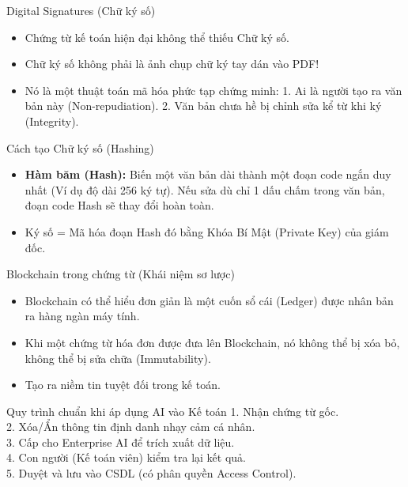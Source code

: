 \documentclass[aspectratio=169]{beamer}
\begin{document}
\begin{frame}{Digital Signatures (Chữ ký số)}
    \begin{itemize}
        \item Chứng từ kế toán hiện đại không thể thiếu Chữ ký số.
        \item Chữ ký số không phải là ảnh chụp chữ ký tay dán vào PDF!
        \item Nó là một thuật toán mã hóa phức tạp chứng minh:
        1. Ai là người tạo ra văn bản này (Non-repudiation).
        2. Văn bản chưa hề bị chỉnh sửa kể từ khi ký (Integrity).
    \end{itemize}
\end{frame}


\begin{frame}{Cách tạo Chữ ký số (Hashing)}
    \begin{itemize}
        \item \textbf{Hàm băm (Hash):} Biến một văn bản dài thành một đoạn code ngắn duy nhất (Ví dụ độ dài 256 ký tự). Nếu sửa dù chỉ 1 dấu chấm trong văn bản, đoạn code Hash sẽ thay đổi hoàn toàn.
        \item Ký số = Mã hóa đoạn Hash đó bằng Khóa Bí Mật (Private Key) của giám đốc.
    \end{itemize}
\end{frame}


\begin{frame}{Blockchain trong chứng từ (Khái niệm sơ lược)}
    \begin{itemize}
        \item Blockchain có thể hiểu đơn giản là một cuốn sổ cái (Ledger) được nhân bản ra hàng ngàn máy tính.
        \item Khi một chứng từ hóa đơn được đưa lên Blockchain, nó không thể bị xóa bỏ, không thể bị sửa chữa (Immutability).
        \item Tạo ra niềm tin tuyệt đối trong kế toán.
    \end{itemize}
\end{frame}


\begin{frame}{Quy trình chuẩn khi áp dụng AI vào Kế toán}
    1. Nhận chứng từ gốc.\\
    2. Xóa/Ẩn thông tin định danh nhạy cảm cá nhân.\\
    3. Cấp cho Enterprise AI để trích xuất dữ liệu.\\
    4. Con người (Kế toán viên) kiểm tra lại kết quả.\\
    5. Duyệt và lưu vào CSDL (có phân quyền Access Control).\\
\end{frame}
\end{document}
